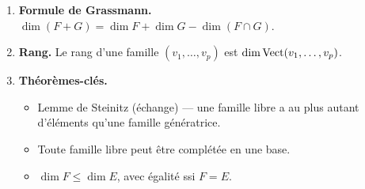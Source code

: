 \begin{framed}
\begin{enumerate}[label=\textbf{\arabic*.},leftmargin=2em]
  \item \textbf{Formule de Grassmann.}
    $\dim(F+G)=\dim F+\dim G-\dim(F\cap G)$.

  \item \textbf{Rang.} Le rang d'une famille $(v_1,\ldots,v_p)$ est
    $\dim\operatorname{Vect}(v_1,\ldots,v_p)$.

  \item \textbf{Théorèmes-clés.}
    \begin{itemize}
      \item Lemme de Steinitz (échange) --- une famille libre a au plus
        autant d'éléments qu'une famille génératrice.
      \item Toute famille libre peut être complétée en une base.
      \item $\dim F\leq\dim E$, avec égalité ssi $F=E$.
    \end{itemize}
\end{enumerate}
\end{framed}
